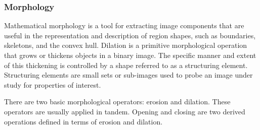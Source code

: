 \subsubsection{Morphology}
Mathematical morphology is a tool for extracting image components that are useful in the representation and description of region shapes, such as boundaries, skeletons, and the convex hull. Dilation is a primitive morphological operation that grows or thickens objects in a binary image. The specific manner and extent of this thickening is controlled by a shape referred to as a structuring element. Structuring elements are small sets or sub-images used to probe an image under study for properties of interest.

There are two basic morphological operators: erosion and dilation. These operators are usually applied in tandem. Opening and closing are two derived operations defined in terms of erosion and dilation.


